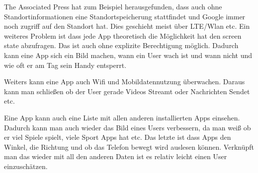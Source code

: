 \documentclass{article}
\begin{document}
The Associated Press hat zum Beispiel herausgefunden, dass auch ohne Standortinformationen eine Standortspeicherung stattfindet und Google immer noch zugriff auf den Standort hat. Dies geschieht meist über LTE/Wlan etc.
Ein weiteres Problem ist dass jede App theoretisch die Möglichkeit hat den screen state abzufragen. Das ist auch ohne explizite Berechtigung möglich. Dadurch kann eine App sich ein Bild machen, wann ein User wach ist und wann nicht und wie oft er am Tag sein Handy entsperrt. 

Weiters kann eine App auch Wifi und Mobildatennutzung überwachen. Daraus kann man schließen ob der User gerade Videos Streamt oder Nachrichten Sendet etc.

Eine App kann auch eine Liste mit allen anderen installierten Apps einsehen. Dadurch kann man auch wieder das Bild eines Users verbessern, da man weiß ob er viel Spiele spielt, viele Sport Apps hat etc. Das letzte ist dass Apps den Winkel, die Richtung und ob das Telefon bewegt wird auslesen können. Verknüpft man das wieder mit all den anderen Daten ist es relativ leicht einen User einzuschätzen.



\end{document}
